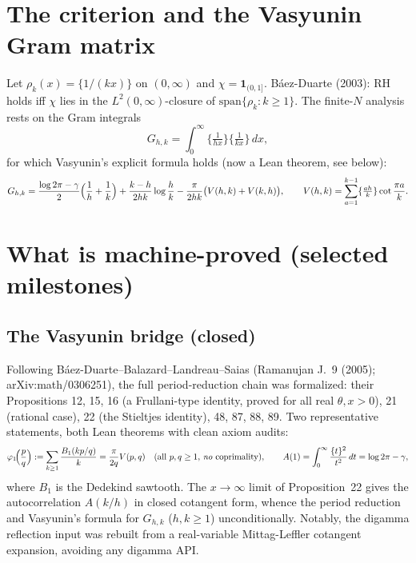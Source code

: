 \documentclass[11pt,a4paper]{article}
\newcommand{\fract}[1]{\{#1\}}
\begin{document}
\section{The criterion and the Vasyunin Gram matrix}
Let $\rho_k(x)=\fract{1/(kx)}$ on $(0,\infty)$ and $\chi=\mathbf 1_{(0,1]}$.
B\'aez-Duarte (2003): RH holds iff $\chi$ lies in the $L^2(0,\infty)$-closure
of $\mathrm{span}\{\rho_k : k\ge 1\}$. The finite-$N$ analysis rests on the
Gram integrals
\[
G_{h,k}=\int_0^\infty \fract{\tfrac1{hx}}\fract{\tfrac1{kx}}\,dx ,
\]
for which Vasyunin's explicit formula holds (now a Lean theorem, see below):
\[
G_{h,k}
=\frac{\log 2\pi-\gamma}{2}\Bigl(\frac1h+\frac1k\Bigr)
+\frac{k-h}{2hk}\log\frac hk
-\frac{\pi}{2hk}\bigl(V(h,k)+V(k,h)\bigr),
\qquad
V(h,k)=\sum_{a=1}^{k-1}\fract{\tfrac{ah}{k}}\cot\frac{\pi a}{k}.
\]

\section{What is machine-proved (selected milestones)}
\subsection{The Vasyunin bridge (closed)}
Following B\'aez-Duarte--Balazard--Landreau--Saias (Ramanujan J.\ 9 (2005);
arXiv:math/0306251), the full period-reduction chain was formalized:
their Propositions 12, 15, 16 (a Frullani-type identity, proved for all real
$\theta,x>0$), 21 (rational case), 22 (the Stieltjes identity), 48, 87, 88, 89.
Two representative statements, both Lean theorems with clean axiom audits:
\[
\varphi_1\!\Bigl(\frac pq\Bigr):=\sum_{k\ge1}\frac{B_1(kp/q)}{k}
=\frac{\pi}{2q}V(p,q)
\quad\text{(all $p,q\ge1$, \emph{no} coprimality)},
\qquad
A(1)=\int_0^\infty\frac{\fract t^2}{t^2}\,dt=\log 2\pi-\gamma,
\]
where $B_1$ is the Dedekind sawtooth. The $x\to\infty$ limit of Proposition~22
gives the autocorrelation $A(k/h)$ in closed cotangent form, whence the
period reduction and Vasyunin's formula for $G_{h,k}$ ($h,k\ge1$)
unconditionally. Notably, the digamma reflection input was rebuilt from a
real-variable Mittag-Leffler cotangent expansion, avoiding any digamma API.
\end{document}
